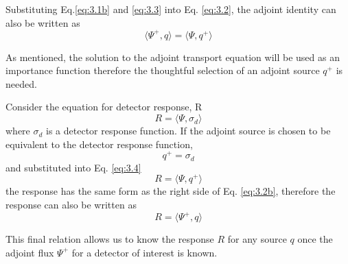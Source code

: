Substituting Eq.\ref{eq:3.1b} and \ref{eq:3.3} into Eq. \ref{eq:3.2}, 
the adjoint identity can also be written as
\begin{equation} \label{eq:3.2b}
		\langle \Psi^{+} , q \rangle =
		\langle \Psi, q^{+} \rangle
\end{equation}

As mentioned, the solution to the adjoint transport
equation will be used as an importance function
therefore the thoughtful selection of an adjoint source $q^{+}$ is needed.

Consider the equation for detector response, R
\begin{equation} \label{eq:3.4}
		R = \langle \Psi, \sigma_{d}\rangle 
\end{equation}
where $\sigma_{d}$ is a detector response function.
If the adjoint source is chosen to be equivalent to the detector response
function,
\begin{equation} \label{eq:3.5}
		q^{+} = \sigma_{d}
\end{equation}
and substituted into Eq. \ref{eq:3.4}  
\begin{equation}\label{eq:resp_adjq}
		R = \langle \Psi, q^{+} \rangle %
\end{equation}
the response has the same form as the right side of Eq. \ref{eq:3.2b}, therefore
the response can also be written as 
\begin{equation}\label{eq:resp_adjf}
		R = \langle \Psi^{+}, q \rangle
\end{equation}

This final relation allows us to know the response $R$ for any source $q$ once the
adjoint flux $\Psi^{+}$ for a detector of interest is known.

